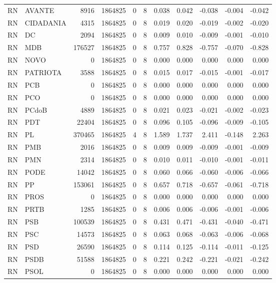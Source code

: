 \begin{landscape}
\begin{longtable}{llrrrrrrrrr}
RN & AVANTE & 8916 & 1864825 & 0 & 8 & 0.038 & 0.042 & -0.038 & -0.004 & -0.042 \\
RN & CIDADANIA & 4315 & 1864825 & 0 & 8 & 0.019 & 0.020 & -0.019 & -0.002 & -0.020 \\
RN & DC & 2094 & 1864825 & 0 & 8 & 0.009 & 0.010 & -0.009 & -0.001 & -0.010 \\
RN & MDB & 176527 & 1864825 & 0 & 8 & 0.757 & 0.828 & -0.757 & -0.070 & -0.828 \\
RN & NOVO & 0 & 1864825 & 0 & 8 & 0.000 & 0.000 & 0.000 & 0.000 & 0.000 \\
RN & PATRIOTA & 3588 & 1864825 & 0 & 8 & 0.015 & 0.017 & -0.015 & -0.001 & -0.017 \\
RN & PCB & 0 & 1864825 & 0 & 8 & 0.000 & 0.000 & 0.000 & 0.000 & 0.000 \\
RN & PCO & 0 & 1864825 & 0 & 8 & 0.000 & 0.000 & 0.000 & 0.000 & 0.000 \\
RN & PCdoB & 4889 & 1864825 & 0 & 8 & 0.021 & 0.023 & -0.021 & -0.002 & -0.023 \\
RN & PDT & 22404 & 1864825 & 0 & 8 & 0.096 & 0.105 & -0.096 & -0.009 & -0.105 \\
RN & PL & 370465 & 1864825 & 4 & 8 & 1.589 & 1.737 & 2.411 & -0.148 & 2.263 \\
RN & PMB & 2016 & 1864825 & 0 & 8 & 0.009 & 0.009 & -0.009 & -0.001 & -0.009 \\
RN & PMN & 2314 & 1864825 & 0 & 8 & 0.010 & 0.011 & -0.010 & -0.001 & -0.011 \\
RN & PODE & 14042 & 1864825 & 0 & 8 & 0.060 & 0.066 & -0.060 & -0.006 & -0.066 \\
RN & PP & 153061 & 1864825 & 0 & 8 & 0.657 & 0.718 & -0.657 & -0.061 & -0.718 \\
RN & PROS & 0 & 1864825 & 0 & 8 & 0.000 & 0.000 & 0.000 & 0.000 & 0.000 \\
RN & PRTB & 1285 & 1864825 & 0 & 8 & 0.006 & 0.006 & -0.006 & -0.001 & -0.006 \\
RN & PSB & 100539 & 1864825 & 0 & 8 & 0.431 & 0.471 & -0.431 & -0.040 & -0.471 \\
RN & PSC & 14573 & 1864825 & 0 & 8 & 0.063 & 0.068 & -0.063 & -0.006 & -0.068 \\
RN & PSD & 26590 & 1864825 & 0 & 8 & 0.114 & 0.125 & -0.114 & -0.011 & -0.125 \\
RN & PSDB & 51588 & 1864825 & 0 & 8 & 0.221 & 0.242 & -0.221 & -0.021 & -0.242 \\
RN & PSOL & 0 & 1864825 & 0 & 8 & 0.000 & 0.000 & 0.000 & 0.000 & 0.000 \\

\end{longtable}
\end{landscape}
